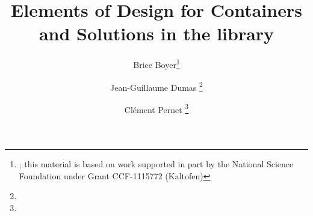\documentclass{article}
\title{Elements of Design for Containers and Solutions in the \linbox library}
\author{Brice Boyer\footnote{\mailto{bbboyer@ncsu.edu}; this material is based on work supported in part by the National Science Foundation
under Grant CCF-1115772 (Kaltofen)}
\and Jean-Guillaume Dumas
\footnote{\mailto{Jean-Guillaume.Dumas@imag.fr}}
\and Cl\'ement Pernet
 \footnote{\mailto{clement.pernet@imag.fr}}
}
\date{}
\newif\ifAbstractOnly
\begin{document}
\maketitle



\ifAbstractOnly
\else



%

%
%
%

%
%
%
%


%

%
%
%
%

%
%
%
%
\fi %



%
%
\end{document}
